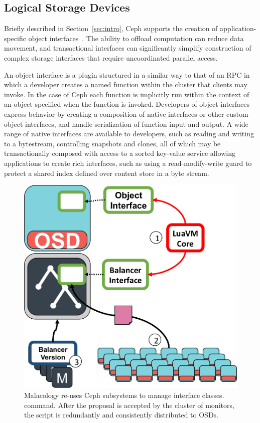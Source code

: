 \documentclass[10pt,twocolumn]{article}
\begin{document}
\subsection{Logical Storage Devices}
\label{active-storage}

Briefly described in Section~\ref{sec:intro}, Ceph supports the creation
of application-specific object interfaces~\cite{weil_rados_2007}. The ability
to offload computation can reduce data movement, and transactional interfaces can
significantly simplify construction of complex storage interfaces that require
uncoordinated parallel access. 

An object interface is a plugin structured in a similar way to that of an RPC
in which a developer creates a named function within the cluster that clients
may invoke. In the case of Ceph each function is implicitly run within the
context of an object specified when the function is invoked. Developers of
object interfaces express behavior by creating a composition of native
interfaces or other custom object interfaces, and handle serialization of
function input and output. A wide range of native interfaces are available to
developers, such as reading and writing to a bytestream, controlling snapshots
and clones, all of which may be transactionally composed with access to a
sorted key-value service allowing applications to create rich interfaces, such
as using a read-modify-write guard to protect a shared index defined over
content store in a byte stream.

\begin{figure}[htbp]
\centering
\includegraphics{figures/implementation.png}
\caption{Malacology re-uses Ceph subsystems to manage interface classes.
command. After the proposal is accepted by the cluster of monitors, the
script is redundantly and consistently distributed to OSDs.
\label{fig:implementation}}
\end{figure}
\end{document}
